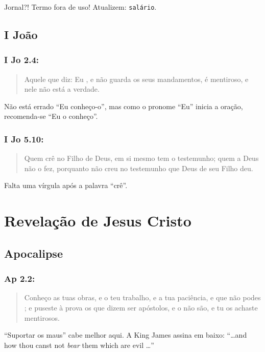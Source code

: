 Jornal?! Termo fora de uso! Atualizem: \texttt{salário}.

\section{I João}
\subsection*{I Jo 2.4:}
\begin{quote}
    \small
Aquele que diz: Eu , e não guarda os seus mandamentos, é mentiroso, e nele não está a verdade.
\end{quote}

Não está errado ``Eu conheço-o'', mas como o pronome ``Eu'' inicia a oração, recomenda-se ``Eu o conheço''.

\subsection*{I Jo 5.10:}
\begin{quote}
    \small
Quem crê no Filho de Deus, em si mesmo tem o
testemunho; quem a Deus não  o fez, porquanto não creu no testemunho que Deus de seu Filho deu.
\end{quote}

Falta uma vírgula após a palavra ``crê''.

\chapter{Revelação de Jesus Cristo}
\section{Apocalipse}
\subsection*{Ap 2.2:}
\begin{quote}
    \small
Conheço as tuas obras, e o teu trabalho, e a tua
 paciência, e que não podes ; e puseste à prova
 os que dizem ser apóstolos, e o não são, e tu os achaste
 mentirosos.
\end{quote}

``Suportar os maus'' cabe melhor aqui. A King James assina em baixo: ``\ldots{}and how thou canst not \emph{bear} them which are evil \ldots''

